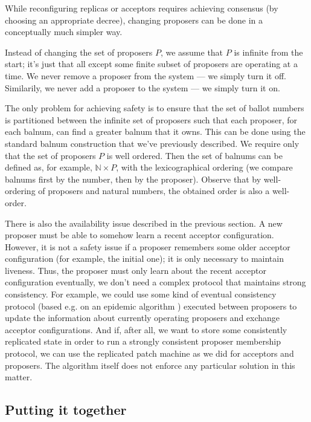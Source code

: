 \documentclass[12pt,a4paper,en]{pracamgr}
\newcommand{\mbb}[1]{\mathbb{#1}}
\begin{document}
While reconfiguring replicas or acceptors requires achieving consensus (by choosing an appropriate decree), changing proposers can be done in a conceptually much simpler way.

Instead of changing the set of proposers $P$, we assume that $P$ is infinite from the start; it's just that all except some finite subset of proposers are operating at a time. We never remove a proposer from the system --- we simply turn it off. Similarily, we never add a proposer to the system --- we simply turn it on.

The only problem for achieving safety is to ensure that the set of ballot numbers is partitioned between the infinite set of proposers such that each proposer, for each balnum, can find a greater balnum that it owns. This can be done using the standard balnum construction that we've previously described. We require only that the set of proposers $P$ is well ordered. Then the set of balnums can be defined as, for example, $\mbb N \times P$, with the lexicographical ordering (we compare balnums first by the number, then by the proposer). Observe that by well-ordering of proposers and natural numbers, the obtained order is also a well-order.

There is also the availability issue described in the previous section. A new proposer must be able to somehow learn a recent acceptor configuration. However, it is not a safety issue if a proposer remembers some older acceptor configuration (for example, the initial one); it is only necessary to maintain liveness. Thus, the proposer must only learn about the recent acceptor configuration eventually, we don't need a complex protocol that maintains strong consistency. For example, we could use some kind of eventual consistency protocol (based e.g. on an epidemic algorithm \cite{epidemic}) executed between proposers to update the information about currently operating proposers and exchange acceptor configurations. And if, after all, we want to store some consistently replicated state in order to run a strongly consistent proposer membership protocol, we can use the replicated patch machine as we did for acceptors and proposers. The algorithm itself does not enforce any particular solution in this matter.

\subsection{Putting it together}
\end{document}
